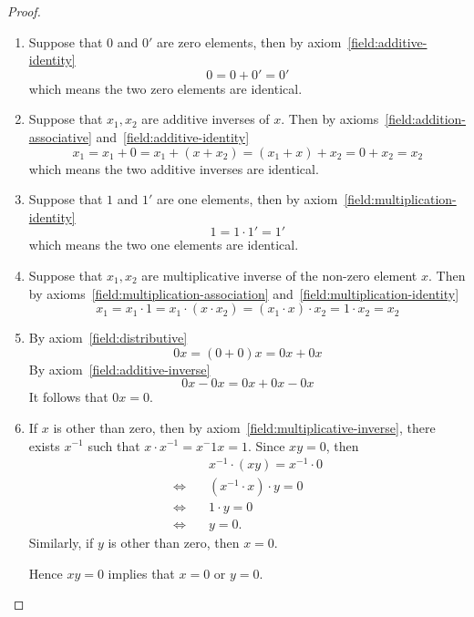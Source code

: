 \begin{proof}
    \begin{enumerate}[label = (\roman*)]
        \item Suppose that $0$ and $0'$ are zero elements, then by axiom~\ref{field:additive-identity}
              \[
                  0 = 0 + 0' = 0'
              \]
              which means the two zero elements are identical.
        \item Suppose that $x_{1}, x_{2}$ are additive inverses of $x$. Then by axioms~\ref{field:addition-associative} and~\ref{field:additive-identity}
              \[
                  x_{1} = x_{1} + 0 = x_{1} + (x + x_{2}) = (x_{1} + x) + x_{2} = 0 + x_{2} = x_{2}
              \]
              which means the two additive inverses are identical.
        \item Suppose that $1$ and $1'$ are one elements, then by axiom~\ref{field:multiplication-identity}
              \[
                  1 = 1\cdot 1' = 1'
              \]
              which means the two one elements are identical.
        \item Suppose that $x_{1}, x_{2}$ are multiplicative inverse of the non-zero element $x$. Then by axioms~\ref{field:multiplication-association} and~\ref{field:multiplication-identity}
              \[
                  x_{1} = x_{1}\cdot 1 = x_{1}\cdot (x\cdot x_{2}) = (x_{1}\cdot x)\cdot x_{2} = 1\cdot x_{2} = x_{2}
              \]
        \item By axiom~\ref{field:distributive}
              \[
                  0x = (0 + 0)x = 0x + 0x
              \]
              By axiom~\ref{field:additive-inverse}
              \[
                  0x - 0x = 0x + 0x - 0x
              \]
              It follows that $0x = 0$.
        \item If $x$ is other than zero, then by axiom~\ref{field:multiplicative-inverse}, there exists $x^{-1}$ such that $x\cdot x^{-1} = x{^-1}x = 1$. Since $xy = 0$, then
              \begin{align*}
                                       & x^{-1}\cdot (xy) = x^{-1}\cdot 0 \\
                  \Leftrightarrow\quad & (x^{-1}\cdot x)\cdot y = 0       \\
                  \Leftrightarrow\quad & 1\cdot y = 0                     \\
                  \Leftrightarrow\quad & y = 0.
              \end{align*}
              Similarly, if $y$ is other than zero, then $x = 0$.

              Hence $xy = 0$ implies that $x = 0$ or $y = 0$.
    \end{enumerate}
\end{proof}

